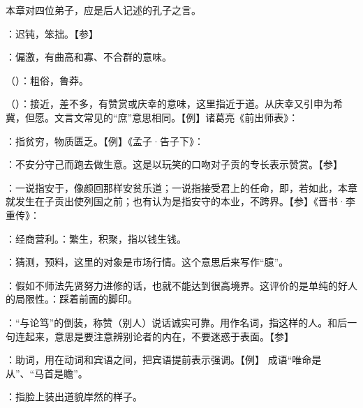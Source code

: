 {
本章对四位弟子，应是后人记述的孔子之言。
\begin{lyitemize}
\item {}：迟钝，笨拙。【参】 
\item {}：偏激，有曲高和寡、不合群的意味。
\item {}（）：粗俗，鲁莽。
\end{lyitemize}
}
{}


{
\item {}（）：接近，差不多，有赞赏或庆幸的意味，这里指近于道。从庆幸又引申为希冀，但愿。文言文常见的“庶”意思相同。【例】诸葛亮《前出师表》：
\item {}：指贫穷，物质匮乏。【例】《孟子·告子下》：
\item {}：不安分守己而跑去做生意。这是以玩笑的口吻对子贡的专长表示赞赏。【参】

：一说指安于，像颜回那样安贫乐道；一说指接受君上的任命，即，若如此，本章就发生在子贡出使列国之前；也有认为是指安守的本业，不跨界。【参】《晋书·李重传》：

：经商营利。：繁生，积聚，指以钱生钱。
\item {}：猜测，预料，这里的对象是市场行情。这个意思后来写作“臆”。
}
{}


{
\item {}：假如不师法先贤努力进修的话，也就不能达到很高境界。这评价的是单纯的好人的局限性。：踩着前面的脚印。
}
{}


{
\item {}：“与论笃”的倒装，称赞（别人）说话诚实可靠。用作名词，指这样的人。和后一句连起来，意思是要注意辨别论者的内在，不要迷惑于表面。【参】

：助词，用在动词和宾语之间，把宾语提前表示强调。【例】 成语“唯命是从”、“马首是瞻”。

\item {}：指脸上装出道貌岸然的样子。
}
{}



